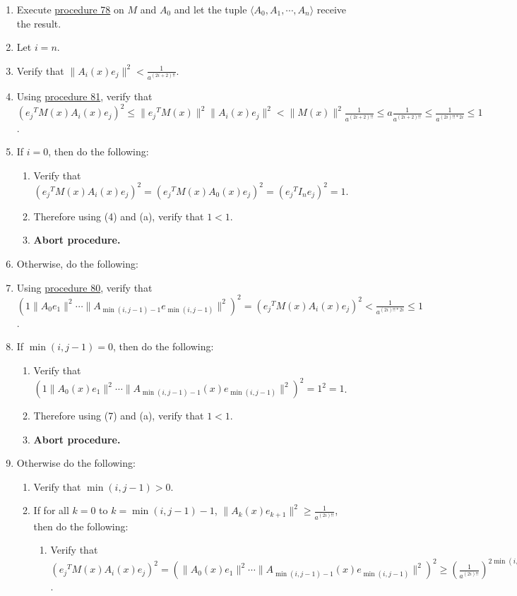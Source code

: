 \documentclass[twocolumn]{article}
\begin{document}
				\begin{enumerate}
					\item Execute \hyperref[sec:procedure 78]{procedure 78} on $M$ and $A_0$ and let the tuple $\langle A_0,A_1,\cdots,A_n\rangle$ receive the result.
					\item Let $i=n$.
					\item Verify that $\lVert A_i(x)e_j\rVert^2<\frac{1}{a^{(2i+2)!!}}$.
					\item Using \hyperref[sec:procedure 81]{procedure 81}, verify that $({e_j}^TM(x)A_i(x)e_j)^2\le\lVert{e_j}^TM(x)\rVert^2\lVert A_i(x)e_j\rVert^2<\lVert M(x)\rVert^2\frac{1}{a^{(2i+2)!!}}\le a\frac{1}{a^{(2i+2)!!}}\le\frac{1}{a^{(2i)!!*2i}}\le 1$.
					\item If $i=0$, then do the following:
					\begin{enumerate}
						\item Verify that $({e_j}^TM(x)A_i(x)e_j)^2=({e_j}^TM(x)A_0(x)e_j)^2=({e_j}^TI_ne_j)^2=1$.
						\item Therefore using (4) and (a), verify that $1<1$.
						\item \textbf{Abort procedure.}
					\end{enumerate}
					\item Otherwise, do the following:
					\item Using \hyperref[sec:procedure 80]{procedure 80}, verify that $(1\lVert A_0e_1\rVert^2\cdots\lVert A_{\min(i,j-1)-1}e_{\min(i,j-1)}\rVert^2)^2=({e_j}^TM(x)A_i(x)e_j)^2<\frac{1}{a^{(2i)!!*2i}}\le 1$.
					\item If $\min(i,j-1)=0$, then do the following:
					\begin{enumerate}
						\item Verify that $(1\lVert A_0(x)e_1\rVert^2\cdots\allowbreak\lVert A_{\min(i,j-1)-1}(x)e_{\min(i,j-1)}\rVert^2)^2=1^2=1$.
						\item Therefore using (7) and (a), verify that $1<1$.
						\item \textbf{Abort procedure.}
					\end{enumerate}
					\item Otherwise do the following:
					\begin{enumerate}
						\item Verify that $\min(i,j-1)>0$.
						\item If for all $k=0$ to $k=\min(i,j-1)-1$, $\lVert A_k(x)e_{k+1}\rVert^2\ge\frac{1}{a^{(2i)!!}}$, then do the following:
						\begin{enumerate}
							\item Verify that $({e_j}^TM(x)A_i(x)e_j)^2=(\lVert A_0(x)e_1\rVert^2\cdots\allowbreak\lVert A_{\min(i,j-1)-1}(x)e_{\min(i,j-1)}\rVert^2)^2\ge(\frac{1}{a^{(2i)!!}})^{2\min(i,j-1)}\ge(\frac{1}{a^{(2i)!!}})^{2i}=\frac{1}{a^{(2i)!!*2i}}$.

\end{enumerate}
\end{enumerate}
\end{enumerate}
\end{document}
